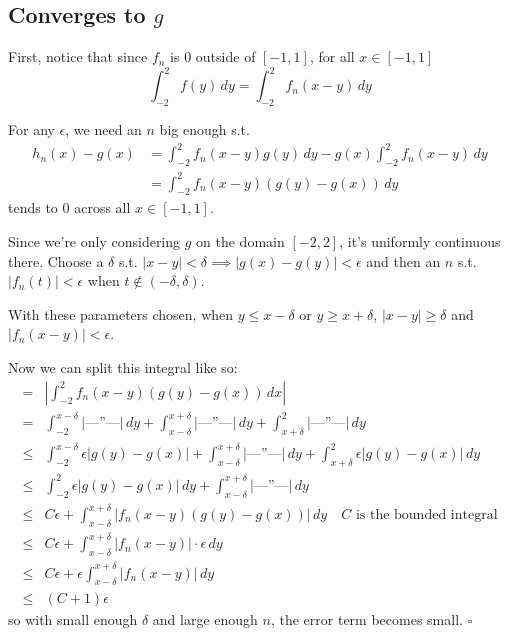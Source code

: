 \documentclass[12pt]{article}
\newcommand*{\ditto}{---''---}
\begin{document}
\pagebreak

\subsection{Converges to \texorpdfstring{$g$}{g}}

First, notice that since $f_n$ is $0$ outside of $[-1, 1]$, for all $x \in [-1, 1]$
\[\int_{-2}^{2} f(y)\,dy = \int_{-2}^{2} f_n(x-y)\,dy\]

For any $\epsilon$, we need an $n$ big enough s.t.
\begin{align*}
  h_n(x)-g(x)
   & = \int_{-2}^{2} f_n(x-y)g(y)\,dy - g(x) \int_{-2}^{2} f_n(x-y)\,dy \\
   & = \int_{-2}^{2} f_n(x-y)(g(y)-g(x))\,dy
\end{align*}
tends to $0$ across all $x \in [-1, 1]$.

Since we're only considering $g$ on the domain $[-2, 2]$, it's uniformly continuous there.
Choose a $\delta$ s.t. $|x-y| < \delta \implies |g(x)-g(y)| < \epsilon$
and then an $n$ s.t. $|f_n(t)| < \epsilon$ when $t \notin (-\delta, \delta)$.

With these parameters chosen, when $y \le x-\delta$ or $y \ge x+\delta$,
$|x-y| \ge \delta$ and $|f_n(x-y)| < \epsilon$.

Now we can split this integral like so:
\begin{align*}
  ={} & \left|\int_{-2}^{2} f_n(x-y)(g(y)-g(x))\,dx\right|                                                                                      \\
  ={} & \int_{-2}^{x-\delta} |\text{\ditto}| \, dy+\int_{x-\delta}^{x+\delta} |\text{\ditto}| \,dy+\int_{x+\delta}^{2} |\text{\ditto}| \,dy     \\
  \le & \int_{-2}^{x-\delta} \epsilon|g(y)-g(x)| + \int_{x-\delta}^{x+\delta} |\text{\ditto}|\,dy + \int_{x+\delta}^{2} \epsilon|g(y)-g(x)|\,dy \\
  \le & \int_{-2}^{2} \epsilon|g(y)-g(x)|\,dy + \int_{x-\delta}^{x+\delta} |\text{\ditto}|\,dy                                                  \\
  \le & C\epsilon + \int_{x-\delta}^{x+\delta} |f_n(x-y)(g(y)-g(x))|\,dy \quad \text{$C$ is the bounded integral}                               \\
  \le & C\epsilon + \int_{x-\delta}^{x+\delta} |f_n(x-y)| \cdot \epsilon\,dy                                                                    \\
  \le & C\epsilon + \epsilon\int_{x-\delta}^{x+\delta} |f_n(x-y)|\,dy                                                                           \\
  \le & (C+1)\epsilon
\end{align*}
so with small enough $\delta$ and large enough $n$, the error term becomes small. $\square$
\end{document}

